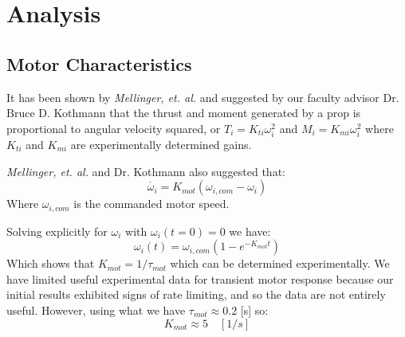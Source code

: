 \documentclass{article}
\numberwithin{equation}{section}
\begin{document}
\section{Analysis}
\subsection{Motor Characteristics}
It has been shown by \emph{Mellinger, et. al.} and suggested by our faculty advisor Dr. Bruce D. Kothmann that the thrust and moment generated by a prop is proportional to angular velocity squared, or $T_i = K_{ti} \omega_i^2$ and $M_i = K_{mi} \omega_i^2$ where $K_{ti}$ and $K_{mi}$ are experimentally determined gains.

\emph{Mellinger, et. al.} and Dr. Kothmann also suggested that:
\[\dot{\omega_i} = K_{mot}\left(\omega_{i,com} - \omega_i\right)\]
Where $\omega_{i,com}$ is the commanded motor speed.

Solving explicitly for $\omega_i$ with $\omega_{i}(t=0) = 0$ we have:
\[\omega_i\left(t\right) = \omega_{i,com}\left(1-e^{-K_{mot}t}\right)\]
Which shows that $K_{mot} = 1/\tau_{mot}$ which can be determined experimentally.  We have limited useful experimental data for transient motor response because our initial results exhibited signs of rate limiting, and so the data are not entirely useful.  However, using what we have $\tau_{mot} \approx 0.2  $ [s] so:
\begin{equation}
\label{motorCoeff}
K_{mot} \approx 5 \quad [1/s]
\end{equation}
\end{document}
